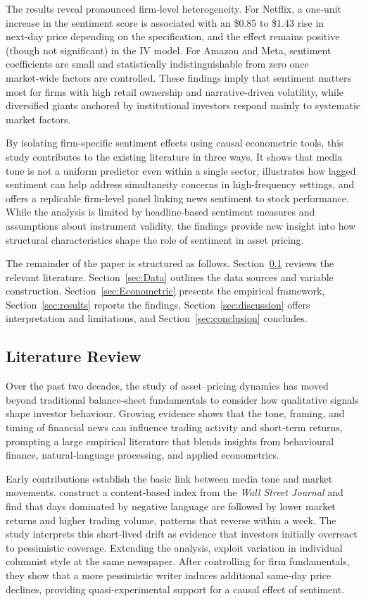 \documentclass[12pt]{article}
\begin{document}
The results reveal pronounced firm‑level heterogeneity. For Netflix, a one‑unit increase in the sentiment score is associated with an \$0.85 to \$1.43 rise in next‑day price depending on the specification, and the effect remains positive (though not significant) in the IV model.  For Amazon and Meta, sentiment coefficients are small and statistically indistinguishable from zero once market‑wide factors are controlled.  These findings imply that sentiment matters most for firms with high retail ownership and narrative‑driven volatility, while diversified giants anchored by institutional investors respond mainly to systematic market factors.

By isolating firm-specific sentiment effects using causal econometric tools, this study contributes to the existing literature in three ways. It shows that media tone is not a uniform predictor even within a single sector, illustrates how lagged sentiment can help address simultaneity concerns in high-frequency settings, and offers a replicable firm-level panel linking news sentiment to stock performance. While the analysis is limited by headline-based sentiment measures and assumptions about instrument validity, the findings provide new insight into how structural characteristics shape the role of sentiment in asset pricing.

The remainder of the paper is structured as follows. Section~\ref{sec:literature_review} reviews the relevant literature. Section~\ref{sec:Data} outlines the data sources and variable construction. Section~\ref{sec:Econometric} presents the empirical framework, Section~\ref{sec:results} reports the findings, Section~\ref{sec:discussion} offers interpretation and limitations, and Section~\ref{sec:conclusion} concludes.

\subsection{Literature Review}
\label{sec:literature_review}

Over the past two decades, the study of asset–pricing dynamics has moved beyond traditional balance‑sheet fundamentals to consider how qualitative signals shape investor behaviour.  Growing evidence shows that the tone, framing, and timing of financial news can influence trading activity and short‑term returns, prompting a large empirical literature that blends insights from behavioural finance, natural‑language processing, and applied econometrics.

Early contributions establish the basic link between media tone and market movements.  \citet{tetlock2007giving} construct a content‑based index from the \textit{Wall Street Journal} and find that days dominated by negative language are followed by lower market returns and higher trading volume, patterns that reverse within a week.  The study interprets this short‑lived drift as evidence that investors initially overreact to pessimistic coverage.  Extending the analysis, \citet{dougal2012journalists} exploit variation in individual columnist style at the same newspaper.  After controlling for firm fundamentals, they show that a more pessimistic writer induces additional same‑day price declines, providing quasi‑experimental support for a causal effect of sentiment.
\end{document}
